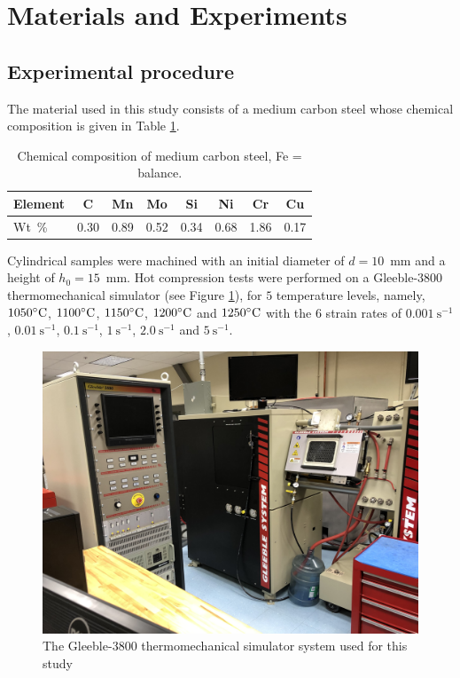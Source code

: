 \documentclass[twoside,english,1p,final,sort&compress]{elsarticle}
\theoremstyle{plain}
\DeclareRobustCommand{\ps}{\text{s}^{-1}}
\begin{document}
\section{Materials and Experiments\label{sec:Materials}}

\subsection{Experimental procedure}

The material used in this study consists of a medium carbon steel whose chemical composition is given in Table \ref{tab:Composition}.
\begin{table}[h!]
\centering
\caption{Chemical composition of medium carbon steel, Fe = balance.}
\begin{tabular}{lccccccc}
	\hline
	Element &  C   &  Mn  &  Mo  &  Si  &  Ni  &  Cr  &  Cu  \\ \hline
	Wt~\%   & 0.30 & 0.89 & 0.52 & 0.34 & 0.68 & 1.86 & 0.17 \\ \hline
\end{tabular}
\label{tab:Composition}
\end{table}
Cylindrical samples were machined with an initial diameter of $d=10$~mm and a height of $h_0=15$~mm.
Hot compression tests were performed on a Gleeble-3800 thermomechanical simulator (see Figure \ref{fig:Gleeble3800}), for $5$ temperature levels, namely, $1050\celsius$, $1100\celsius$, $1150\celsius$, $1200\celsius$ and $1250\celsius$ with the $6$ strain rates of $0.001~\ps$, $0.01~\ps$, $0.1~\ps$, $1~\ps$, $2.0~\ps$ and $5~\ps$.
\begin{figure}[!ht]
\centering
\includegraphics[width=0.7\columnwidth]{Figures/Gleeble-3800}
\caption{The Gleeble-3800 thermomechanical simulator system used for this study}
\label{fig:Gleeble3800}
\end{figure}
\end{document}

